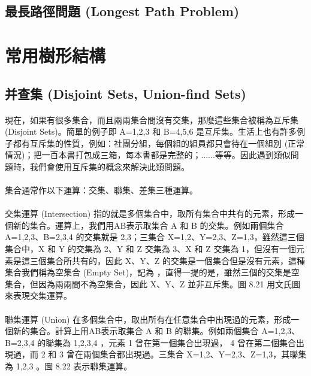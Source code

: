 \documentclass[12pt,a4paper,oneside]{report}
\begin{document}
\begin{CJK}{UTF8}{bkai}
\subsection{最長路徑問題 (Longest Path Problem)}

\section{常用樹形結構}

\subsection{并查集 (Disjoint Sets, Union-find Sets)}

\paragraph{}現在，如果有很多集合，而且兩兩集合間沒有交集，那麼這些集合被稱為互斥集 (Disjoint Sets)。簡單的例子即 A={1,2,3} 和 B={4,5,6} 是互斥集。生活上也有許多例子都有互斥集的性質，例如：社團分組，每個組的組員都只會待在一個組別 (正常情況)；把一百本書打包成三箱，每本書都是完整的；......等等。因此遇到類似問題時，我們會使用互斥集的概念來解決此類問題。

\paragraph{}集合通常作以下運算：交集、聯集、差集三種運算。

\paragraph{}交集運算 (Intersection) 指的就是多個集合中，取所有集合中共有的元素，形成一個新的集合。運算上，我們用AB表示取集合 A 和 B 的交集。例如兩個集合 A={1,2,3}、B={2,3,4} 的交集就是 {2,3}；三集合 X={1,2}、Y={2,3}、Z={1,3}，雖然這三個集合中，X 和 Y 的交集為 {2}、Y 和 Z 交集為 {3}、X 和 Z 交集為 {1}，但沒有一個元素是這三個集合所共有的，因此 X、Y、Z 的交集是一個集合但是沒有元素，這種集合我們稱為空集合 (Empty Set)，記為 ，直得一提的是，雖然三個的交集是空集合，但因為兩兩間不為空集合，因此 X、Y、Z 並非互斥集。圖 8.21 用文氏圖來表現交集運算。

\paragraph{}聯集運算 (Union) 在多個集合中，取出所有在任意集合中出現過的元素，形成一個新的集合。計算上用AB表示取集合 A 和 B 的聯集。例如兩個集合 A={1,2,3}、B={2,3,4} 的聯集為 {1,2,3,4} ，元素 1 曾在第一個集合出現過， 4 曾在第二個集合出現過，而 2 和 3 曾在兩個集合都出現過。三集合 X={1,2}、Y={2,3}、Z={1,3}，其聯集為 {1,2,3} 。圖 8.22 表示聯集運算。


\end{CJK}
\end{document}
